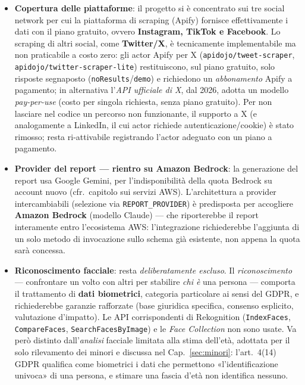 \documentclass[11pt,a4paper]{article}
\begin{document}
\begin{itemize}[nosep]
        di testo --- il rumore residuo è quindi fatto di entità \emph{reali ma non
        pertinenti}, contro cui un filtro non può nulla. Il limite è \textbf{dichiarato e
        accettato}: il dominio d'uso dello strumento è il profilo personale, per il quale
        è stato tarato e valutato; sui profili di personaggi pubblici l'output va
        considerato indicativo.
  \item \textbf{Copertura delle piattaforme}: il progetto si è concentrato sui tre
        social network per cui la piattaforma di scraping (Apify) fornisce
        effettivamente i dati con il piano gratuito, ovvero \textbf{Instagram, TikTok e
        Facebook}. Lo scraping di altri social, come \textbf{Twitter/X}, è tecnicamente
        implementabile ma non praticabile a costo zero: gli actor Apify per X
        (\texttt{apidojo/tweet-scraper}, \texttt{apidojo/twitter-scraper-lite})
        restituiscono, sul piano gratuito, solo risposte segnaposto
        (\texttt{noResults}/\texttt{demo}) e richiedono un \emph{abbonamento} Apify a
        pagamento; in alternativa l'\emph{API ufficiale di X}, dal 2026, adotta un
        modello \emph{pay-per-use} (costo per singola richiesta, senza piano gratuito).
        Per non lasciare nel codice un percorso non funzionante, il supporto a X
        (e analogamente a LinkedIn, il cui actor richiede autenticazione/cookie) è
        stato rimosso; resta ri-attivabile registrando l'actor adeguato con un piano a
        pagamento.
  \item \textbf{Provider del report --- rientro su Amazon Bedrock}: la generazione del
        report usa Google Gemini, per l'indisponibilità della quota Bedrock su
        account nuovo (cfr.\ capitolo sui servizi AWS). L'architettura a provider
        intercambiabili (selezione via \texttt{REPORT\_PROVIDER}) è predisposta per
        accogliere \textbf{Amazon Bedrock} (modello Claude) --- che riporterebbe il report
        interamente entro l'ecosistema AWS: l'integrazione richiederebbe l'aggiunta di un
        solo metodo di invocazione sullo schema già esistente, non appena la quota sarà
        concessa.
  \item \textbf{Riconoscimento facciale}: resta \emph{deliberatamente escluso}. Il
        \emph{riconoscimento} --- confrontare un volto con altri per stabilire \emph{chi è}
        una persona --- comporta il trattamento di \textbf{dati biometrici}, categoria
        particolare ai sensi del GDPR, e richiederebbe garanzie rafforzate (base giuridica
        specifica, consenso esplicito, valutazione d'impatto). Le API corrispondenti di
        Rekognition (\texttt{IndexFaces}, \texttt{CompareFaces},
        \texttt{SearchFacesByImage}) e le \emph{Face Collection} non sono usate. Va però
        distinto dall'\emph{analisi} facciale limitata alla stima dell'età, adottata per il
        solo rilevamento dei minori e discussa nel Cap.~\ref{sec:minori}: l'art.~4(14) GDPR
        qualifica come biometrici i dati che permettono «l'identificazione univoca» di una
        persona, e stimare una fascia d'età non identifica nessuno.
\end{itemize}
\end{document}
